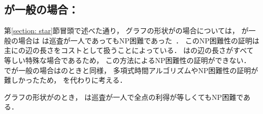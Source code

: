 \subsection{{\maxIdletime}が一般の場合：{\timeSpecifiedPatProb}}
第\ref{section: star}節冒頭で述べた通り，
グラフの形状が{\graphStar}の場合については，
{\maxIdletime}が一般の場合は
{\patProb}は巡査が一人であってもNP困難であった~\cite{coene2011charlemagne}．
このNP困難性の証明は主に{\graphStar}の辺の長さをコストとして扱うことによっている．
{\graphUnit}は{\graphStar}の辺の長さがすべて等しい特殊な場合であるため，
この方法によるNP困難性の証明ができない．
{\graphUnit}で{\maxIdletime}が一般の場合は{\graphLine}のときと同様，
多項式時間アルゴリズムやNP困難性の証明が難しかったため，
{\timeSpecifiedPatProb}を代わりに考える．


\begin{theo}
\label{theo:unit_exacidletime_NPhard}
グラフの形状が{\graphUnit}のとき，
{\timeSpecifiedPatProb}は巡査が一人で全点の利得が等しくてもNP困難である．
\end{theo}
